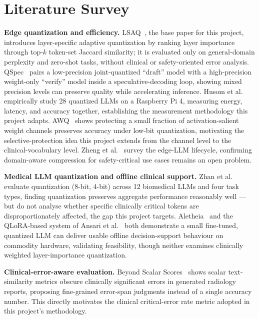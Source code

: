 \documentclass[conference]{IEEEtran}
\begin{document}
\section{Literature Survey}
\textbf{Edge quantization and efficiency.} LSAQ~\cite{zeng2024lsaq}, the base paper for this project, introduces layer-specific adaptive quantization by ranking layer importance through top-$k$ token-set Jaccard similarity; it is evaluated only on general-domain perplexity and zero-shot tasks, without clinical or safety-oriented error analysis. QSpec~\cite{zhao2025qspec} pairs a low-precision joint-quantized ``draft'' model with a high-precision weight-only ``verify'' model inside a speculative-decoding loop, showing mixed precision levels can preserve quality while accelerating inference. Husom et al.~\cite{husom2025sustainable} empirically study 28 quantized LLMs on a Raspberry Pi 4, measuring energy, latency, and accuracy together, establishing the measurement methodology this project adapts. AWQ~\cite{lin2024awq} shows protecting a small fraction of activation-salient weight channels preserves accuracy under low-bit quantization, motivating the selective-protection idea this project extends from the channel level to the clinical-vocabulary level. Zheng et al.~\cite{zheng2024review} survey the edge-LLM lifecycle, confirming domain-aware compression for safety-critical use cases remains an open problem.

\textbf{Medical LLM quantization and offline clinical support.} Zhan et al.~\cite{zhan2025quantized} evaluate quantization (8-bit, 4-bit) across 12 biomedical LLMs and four task types, finding quantization preserves aggregate performance reasonably well --- but do not analyse whether specific clinically critical tokens are disproportionately affected, the gap this project targets. Aletheia~\cite{walusimbi2026aletheia} and the QLoRA-based system of Ansari et al.~\cite{ansari2025lightweight} both demonstrate a small fine-tuned, quantized LLM can deliver usable offline decision-support behaviour on commodity hardware, validating feasibility, though neither examines clinically weighted layer-importance quantization.

\textbf{Clinical-error-aware evaluation.} Beyond Scalar Scores~\cite{lu2026beyond} shows scalar text-similarity metrics obscure clinically significant errors in generated radiology reports, proposing fine-grained error-span judgments instead of a single accuracy number. This directly motivates the clinical critical-error rate metric adopted in this project's methodology.
\end{document}
